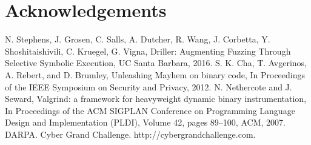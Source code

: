\documentclass[a4paper]{article}
\begin{document}
\section{Acknowledgements}
\label{sec:Acks}
\begin{thebibliography}{9}
	N. Stephens, J. Grosen, C. Salls, A. Dutcher, R. Wang, J. Corbetta, Y. Shoshitaishivili, C. Kruegel, G.  Vigna,
	Driller: Augmenting Fuzzing Through Selective Symbolic Execution,
	UC Santa Barbara,
	2016.
	S. K. Cha, T. Avgerinos, A. Rebert, and D. Brumley,
	Unleashing Mayhem on binary code,
	In Proceedings of the IEEE Symposium on Security and Privacy,
	2012.
	N. Nethercote and J. Seward,
	Valgrind: a framework for heavyweight dynamic binary instrumentation, 
	In Proceedings of the ACM SIGPLAN Conference on Programming Language Design and Implementation (PLDI),
	Volume 42,
	pages 89–100, 
	ACM,
	2007.
	DARPA. Cyber Grand Challenge. http://cybergrandchallenge.com.
\end{thebibliography}

\end{document}
